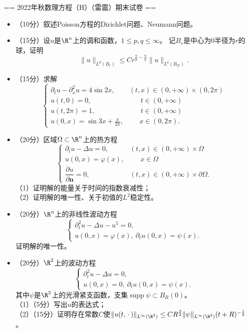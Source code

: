 == 2022年秋数理方程（H）（雷震）期末试卷 ==

\begin{itemize}
    \item[1.] （10分）叙述Poisson方程的Dirichlet问题、Neumann问题。

    \item[2.] （15分）设$u$是$\R^n$上的调和函数，$1\leq p,q\leq\infty$。
    记$B_r$是中心为$0$半径为$r$的球，证明
    $$\|u\|_{L^p(B_r)}\leq Cr^{\frac{n}{p}-\frac{n}{q}}\|u\|_{L^q(B_{2r})}.$$

    \item[3.] （15分）求解
    $$\begin{cases}
        \partial_tu-\partial_x^2u=4\sin 2x,&(t,x)\in(0,+\infty)\times(0,2\pi)\\
        u(t,0)=0,&\quad\ \ \ t\in(0,+\infty)\\
        u(t,2\pi)=1,&\quad\ \ \ t\in(0,+\infty)\\
        u(0,x)=\sin 3x+\frac{x}{2\pi},&\quad\,\,\,x\in(0,2\pi).
    \end{cases}$$

    \item[4.] （20分）区域$\Omega\subset\R^n$上的热方程
    $$\begin{cases}
        \partial_tu-\Delta u=0,&(t,x)\in(0,+\infty)\times\Omega\\
        u(0,x)=\varphi(x),&\quad\,\,\ x\in\Omega\\
        \dfrac{\partial u}{\partial\boldsymbol{n}}=0,&(t,x)\in(0,+\infty)\times\partial\Omega.
    \end{cases}$$
    （1）证明解的能量关于时间的指数衰减性；\\
    （2）证明解的唯一性、关于初值的$L^2$稳定性。

    \item[5.] （20分）$\R^n$上的非线性波动方程
    $$\begin{cases}
        \partial_t^2u-\Delta u-u^5=0,\\
        u(0,x)=\varphi(x),\ \partial_tu(0,x)=\psi(x).
    \end{cases}$$
    证明解的唯一性。

    \item[6.] （20分）$\R^2$上的波动方程
    $$\begin{cases}
        \partial_t^2u-\Delta u=0,\\
        u(0,x)=0,\ \partial_tu(0,x)=\psi(x).
    \end{cases}$$
    其中$\psi$是$\R^2$上的光滑紧支函数，支集$\operatorname{supp}\psi\subset B_R(0)$。\\
    （1）（5分）写出$u$的表达式；\\
    （2）（15分）证明存在常数$C$使$\|u(t,\,\cdot\,)\|_{L^\infty(\R^2)}
    \leq CR^{\frac{3}{2}}\|\psi\|_{L^\infty(\R^2)}(t+R)^{-\frac{1}{2}}$。
\end{itemize}
